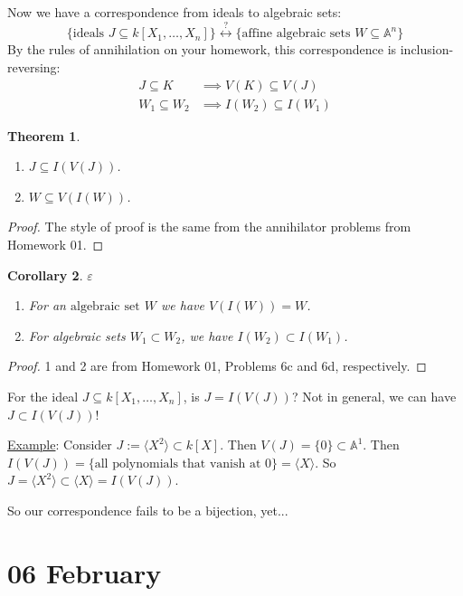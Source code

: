 \documentclass[12pt]{article}
\newcommand{\vbrack}[1]{\langle #1\rangle}
\newtheorem{theorem}{Theorem}[section]
\newtheorem{corollary}[theorem]{Corollary}
\theoremstyle{definition}
\begin{document}
Now we have a correspondence from ideals to algebraic sets:
\begin{equation}
    \{\text{ideals }J\subseteq k[X_1,\dotsc,X_n]\}\stackrel{?}{\longleftrightarrow}\{\text{affine algebraic sets }W\subseteq\mathbb{A}^n\}
\end{equation}
By the rules of annihilation on your homework, this correspondence is inclusion-reversing:
\begin{equation*}
    \begin{split}
        J\subseteq K&\implies V(K)\subseteq V(J)\\
        W_1\subseteq W_2&\implies I(W_2)\subseteq I(W_1)
    \end{split}
\end{equation*}
\begin{theorem}
   \begin{enumerate}
        \item $J\subseteq I(V(J))$.
        \item $W\subseteq V(I(W))$.
    \end{enumerate} 
\end{theorem}
\begin{proof}
    The style of proof is the same from the annihilator problems from Homework 01.
\end{proof}
\begin{corollary}{$\varepsilon$}
    \begin{enumerate}
        \item For an $\mathrm{algebraic}$ $\mathrm{set}$ $W$ we have $V(I(W))=W$.
        \item For algebraic sets $W_1\subset W_2$, we have $I(W_2)\subset I(W_1)$.
    \end{enumerate}
\end{corollary}
\begin{proof}
    1 and 2 are from Homework 01, Problems 6c and 6d, respectively.
\end{proof}
For the ideal $J\subseteq k[X_1,\dotsc,X_n]$, is $J=I(V(J))$? Not in general, we can have $J\subset I(V(J))$!

\underline{Example}: Consider $J:=\vbrack{X^2}\subset k[X]$. Then $V(J)=\{0\}\subset\mathbb{A}^1$. Then $I(V(J))=\{\text{all polynomials that vanish at 0}\}=\vbrack{X}$. So $J=\vbrack{X^2}\subset\vbrack{X}=I(V(J))$.

So our correspondence fails to be a bijection, yet...
\section{06 February}
\end{document}

